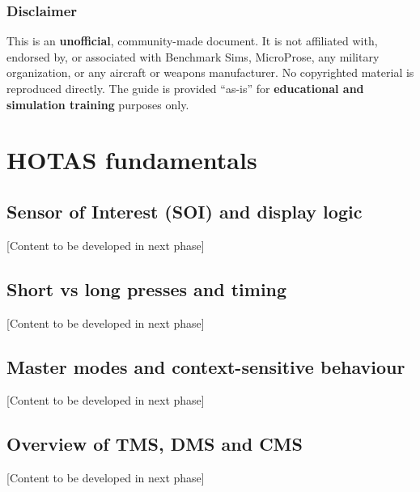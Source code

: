 \documentclass[11pt, a4paper, twoside]{report}
\begin{document}
\subsection{Disclaimer}
\label{sec:C1-S4-S5}

This is an \textbf{unofficial}, community-made document. It is not affiliated with, endorsed by, or associated with Benchmark Sims, MicroProse, any military organization, or any aircraft or weapons manufacturer. No copyrighted material is reproduced directly. The guide is provided ``as-is'' for \textbf{educational and simulation training} purposes only.

\newpage
\chapter{HOTAS fundamentals}
\label{chap:C2}

\section{Sensor of Interest (SOI) and display logic}
\label{sec:C2-S1}
[Content to be developed in next phase]

\section{Short vs long presses and timing}
\label{sec:C2-S2}
[Content to be developed in next phase]

\section{Master modes and context-sensitive behaviour}
\label{sec:C2-S3}
[Content to be developed in next phase]

\section{Overview of TMS, DMS and CMS}
\label{sec:C2-S4}
[Content to be developed in next phase]
\newpage
\end{document}
